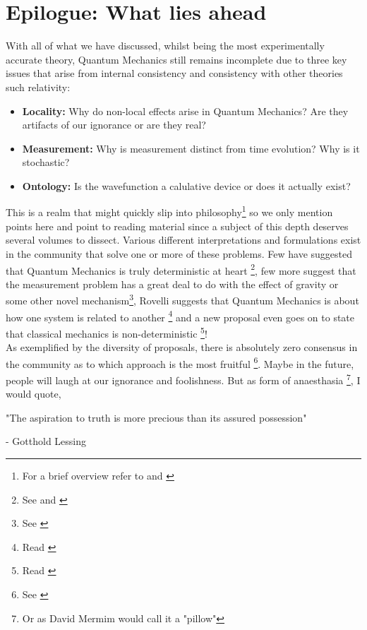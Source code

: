 \chapter{Epilogue: What lies ahead} \label{epi}
With all of what we have  discussed, whilst being the most experimentally accurate theory, Quantum Mechanics still remains incomplete due to three key issues that arise from internal consistency and consistency with other theories such relativity: 
\begin{itemize}
\item \textbf{Locality:} Why do non-local effects arise in Quantum Mechanics? Are they artifacts of our ignorance or are they real?
\item \textbf{Measurement:} Why is measurement distinct from time evolution? Why is it stochastic?
\item \textbf{Ontology:} Is the wavefunction a calulative device or does it actually exist?
\end{itemize}
This is a realm that might quickly slip into philosophy\footnote{For a brief overview refer to \cite{p27} and \cite{p28}} so we only mention points here and point to reading material since a subject of this depth deserves several volumes to dissect. Various different interpretations and formulations exist in the community that solve one or more of these problems. Few have suggested that Quantum Mechanics is truly deterministic at heart \footnote{See \cite{p26} and \cite{p24}}, few more suggest that the measurement problem has a great deal to do with the effect of gravity or some other novel mechanism\footnote{See \cite{p2}}, Rovelli suggests that Quantum Mechanics is about how one system is related to another \footnote{Read \cite{p25}} and a new proposal even goes on to state that classical mechanics is non-deterministic \footnote{Read \cite{p29}}! 
\\
As exemplified by the diversity of proposals, there is absolutely zero consensus in the community as to which approach is the most fruitful \footnote{See \cite{p31}}. Maybe in the future, people will laugh at our ignorance and foolishness. But as form of anaesthasia \footnote{Or as David Mermim would call it a "pillow"}, I would quote,
\begin{tcolorbox}
\begin{center}
"The aspiration to truth is more precious than its assured possession" 
\end{center}
- Gotthold Lessing
\end{tcolorbox}
